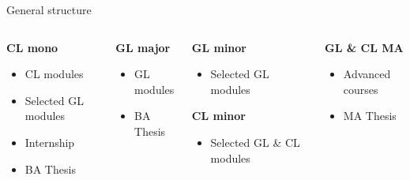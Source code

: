 \documentclass[aspectratio=169,hyperref={unicode},xcolor={dvipsnames}]{beamer}
\begin{document}
\begin{frame}{General structure}
\begin{columns}[T]
	\begin{column}{0.25\linewidth}
		\textbf{CL mono}
		\begin{itemize}
			\item CL modules
			\item Selected GL modules
			\item Internship
			\item BA Thesis
		\end{itemize}
	\end{column}
	\begin{column}{0.25\linewidth}
		\textbf{GL major}
		\begin{itemize}
			\item GL modules
			\item BA Thesis
		\end{itemize}
	\end{column}
	 \begin{column}{0.25\linewidth}
	 \textbf{GL minor}
	 	\begin{itemize}
	 		\item Selected GL modules
	 	\end{itemize}
	 \textbf{CL minor}
	 	 \begin{itemize}
	 		\item Selected GL \& CL modules
	 	\end{itemize}
   	\end{column}
	\begin{column}{0.25\linewidth}
		\textbf{GL \& CL MA}
		\begin{itemize}
			\item Advanced courses
			\item MA Thesis
		\end{itemize}
	\end{column}
\end{columns}
\end{frame}
\end{document}
